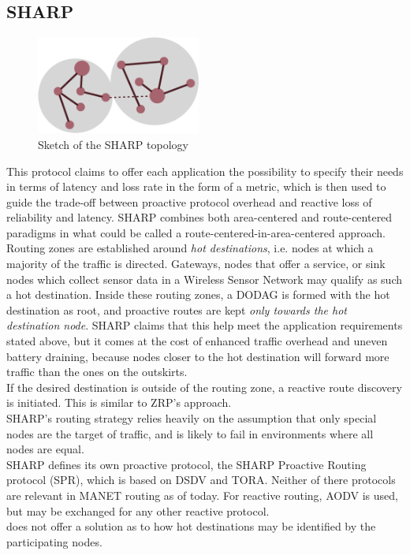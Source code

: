 \documentclass[a4paper,10pt]{scrartcl}
\begin{document}
\newpage %

\subsection{\gls{SHARP}}
\label{subsec:sharp}
\begin{figure}
  \begin{center}
    \includegraphics[width=0.48\textwidth]{../images/SHARP}
  \end{center}
  \label{fig:area_centered}
  \caption{Sketch of the SHARP topology}
\end{figure}

This protocol claims to offer each application the possibility to specify their needs in terms of latency and loss rate in the form of a metric, which is then used to guide the trade-off between proactive protocol overhead and reactive loss of reliability and latency.
SHARP combines both area-centered and route-centered paradigms in what could be called a route-centered-in-area-centered approach. Routing zones are established around \emph{hot destinations}, i.e. nodes at which a majority of the traffic is directed. Gateways, nodes that offer a service, or sink nodes which collect sensor data in a Wireless Sensor Network may qualify as such a hot destination. Inside these routing zones, a \gls{DODAG} is formed with the hot destination as root, and proactive routes are kept \emph{only towards the hot destination node}. SHARP claims that this help meet the application requirements stated above, but it comes at the cost of enhanced traffic overhead and uneven battery draining, because nodes closer to the hot destination will forward more traffic than the ones on the outskirts.\\
If the desired destination is outside of the routing zone, a reactive route discovery is initiated. This is similar to ZRP's approach.\\
SHARP's routing strategy relies heavily on the assumption that only special nodes are the target of traffic, and is likely to fail in environments where all nodes are equal.\\
SHARP defines its own proactive protocol, the SHARP Proactive Routing protocol (SPR), which is based on DSDV\cite{DSDV} and TORA\cite{TORA}. Neither of there protocols are relevant in MANET routing as of today.
For reactive routing, AODV is used, but may be exchanged for any other reactive protocol.\\
\cite{SHARP} does not offer a solution as to how hot destinations may be identified by the participating nodes.
\end{document}
